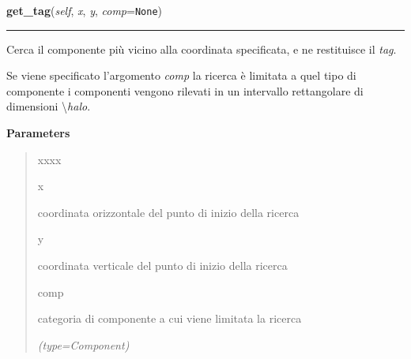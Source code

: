     \label{pla:Pla:get_tag}

    \vspace{0.5ex}

\hspace{.8\funcindent}\begin{boxedminipage}{\funcwidth}

    \raggedright \textbf{get\_tag}(\textit{self}, \textit{x}, \textit{y}, \textit{comp}={\tt None})

    \vspace{-1.5ex}

    \rule{\textwidth}{0.5\fboxrule}
\setlength{\parskip}{2ex}
    Cerca il componente più vicino alla coordinata specificata, e ne 
    restituisce il \textit{tag}.

    Se viene specificato l'argomento \textit{comp} la ricerca è limitata a 
    quel tipo di componente i componenti vengono rilevati in un intervallo 
    rettangolare di dimensioni {\textbackslash}\textit{halo}.

\setlength{\parskip}{1ex}
      \textbf{Parameters}
      \vspace{-1ex}

      \begin{quote}
        \begin{Ventry}{xxxx}

          \item[x]

          coordinata orizzontale del punto di inizio della ricerca

          \item[y]

          coordinata verticale del punto di inizio della ricerca

          \item[comp]

          categoria di componente a cui viene limitata la ricerca

            {\it (type=Component)}

        \end{Ventry}

      \end{quote}

    \end{boxedminipage}

    \label{pla:Pla:handler}

